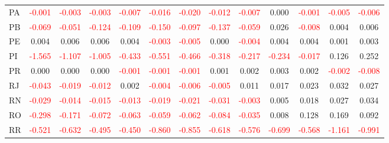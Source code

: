 \documentclass[a4paper, 12pt]{article}
\begin{document}
\begin{table}[H]
{\begin{tabular}{lcccccccccccc}
      PA & \textcolor{red}{-0.001} & \textcolor{red}{-0.003} & \textcolor{red}{-0.003} & \textcolor{red}{-0.007} & \textcolor{red}{-0.016} & \textcolor{red}{-0.020} & \textcolor{red}{-0.012} & \textcolor{red}{-0.007} & 0.000 & \textcolor{red}{-0.001} & \textcolor{red}{-0.005} & \textcolor{red}{-0.006}\\
      PB & \textcolor{red}{-0.069} & \textcolor{red}{-0.051} & \textcolor{red}{-0.124} & \textcolor{red}{-0.109} & \textcolor{red}{-0.150} & \textcolor{red}{-0.097} & \textcolor{red}{-0.137} & \textcolor{red}{-0.059} & 0.026 & \textcolor{red}{-0.008} & 0.004 & 0.006\\
      PE & 0.004 & 0.006 & 0.006 & 0.004 & \textcolor{red}{-0.003} & \textcolor{red}{-0.005} & 0.000 & \textcolor{red}{-0.004} & 0.004 & 0.004 & 0.001 & 0.003\\
      PI & \textcolor{red}{-1.565} & \textcolor{red}{-1.107} & \textcolor{red}{-1.005} & \textcolor{red}{-0.433} & \textcolor{red}{-0.551} & \textcolor{red}{-0.466} & \textcolor{red}{-0.318} & \textcolor{red}{-0.217} & \textcolor{red}{-0.234} & \textcolor{red}{-0.017} & 0.126 & 0.252\\
      PR & 0.000 & 0.000 & 0.000 & \textcolor{red}{-0.001} & \textcolor{red}{-0.001} & \textcolor{red}{-0.001} & 0.001 & 0.002 & 0.003 & 0.002 & \textcolor{red}{-0.002} & \textcolor{red}{-0.008}\\
      RJ & \textcolor{red}{-0.043} & \textcolor{red}{-0.019} & \textcolor{red}{-0.012} & 0.002 & \textcolor{red}{-0.004} & \textcolor{red}{-0.006} & \textcolor{red}{-0.005} & 0.011 & 0.017 & 0.023 & 0.032 & 0.027\\
      RN & \textcolor{red}{-0.029} & \textcolor{red}{-0.014} & \textcolor{red}{-0.015} & \textcolor{red}{-0.013} & \textcolor{red}{-0.019} & \textcolor{red}{-0.021} & \textcolor{red}{-0.031} & \textcolor{red}{-0.003} & 0.005 & 0.018 & 0.027 & 0.034\\
      RO & \textcolor{red}{-0.298} & \textcolor{red}{-0.171} & \textcolor{red}{-0.072} & \textcolor{red}{-0.063} & \textcolor{red}{-0.059} & \textcolor{red}{-0.062} & \textcolor{red}{-0.084} & \textcolor{red}{-0.035} & 0.008 & 0.128 & 0.169 & 0.092\\
      RR & \textcolor{red}{-0.521} & \textcolor{red}{-0.632} & \textcolor{red}{-0.495} & \textcolor{red}{-0.450} & \textcolor{red}{-0.860} & \textcolor{red}{-0.855} & \textcolor{red}{-0.618} & \textcolor{red}{-0.576} & \textcolor{red}{-0.699} & \textcolor{red}{-0.568} & \textcolor{red}{-1.161} & \textcolor{red}{-0.991}\\

\end{tabular}}
\end{table}
\end{document}
